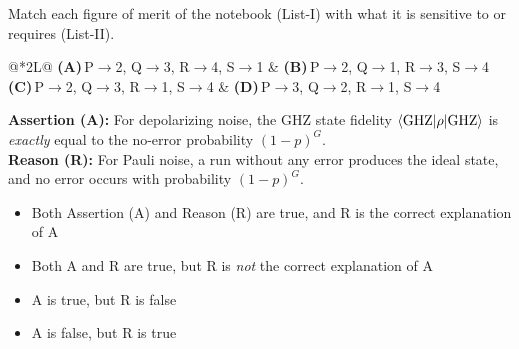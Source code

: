 \documentclass[11pt,a4paper]{article}
\newcommand{\optlabel}[1]{\textbf{(#1)}}
\newenvironment{qitem}[1]{\begin{list}{}{\setlength{\leftmargin}{3.3em}\setlength{\labelwidth}{3.1em}%
  \setlength{\labelsep}{0.2em}\setlength{\topsep}{3pt}\setlength{\parsep}{3pt}}\item[\textbf{Q.#1}\hfill]}{\end{list}}
\newcommand{\qsep}{\par\vspace{2pt}{\color{black!15}\hrule}\vspace{4pt}}
\begin{document}
\begin{qitem}{56}
Match each figure of merit of the notebook (List-I) with what it is sensitive to or requires (List-II).
\par\smallskip{}
\par\smallskip\noindent\begin{tabularx}{\linewidth}{@{}*{2}{L}@{}}
\optlabel{A}\,P$\to$2, Q$\to$3, R$\to$4, S$\to$1 & \optlabel{B}\,P$\to$2, Q$\to$1, R$\to$3, S$\to$4 \\[3pt]
\optlabel{C}\,P$\to$2, Q$\to$3, R$\to$1, S$\to$4 & \optlabel{D}\,P$\to$3, Q$\to$2, R$\to$1, S$\to$4
\end{tabularx}
\end{qitem}
\qsep

\begin{qitem}{57}
\textbf{Assertion (A):} For depolarizing noise, the GHZ state fidelity $\braket{\mathrm{GHZ}|\rho|\mathrm{GHZ}}$ is \emph{exactly} equal to the
no-error probability $(1 - p)^G$.\\[1mm]
\textbf{Reason (R):} For Pauli noise, a run without any error produces the ideal state, and no error occurs with probability $(1 - p)^G$.
\begin{itemize}[leftmargin=2.6em, labelsep=0.4em, itemsep=2pt, topsep=3pt]
\item[\optlabel{A}] Both Assertion (A) and Reason (R) are true, and R is the correct explanation of A
\item[\optlabel{B}] Both A and R are true, but R is \emph{not} the correct explanation of A
\item[\optlabel{C}] A is true, but R is false
\item[\optlabel{D}] A is false, but R is true
\end{itemize}
\end{qitem}
\qsep
\end{document}

